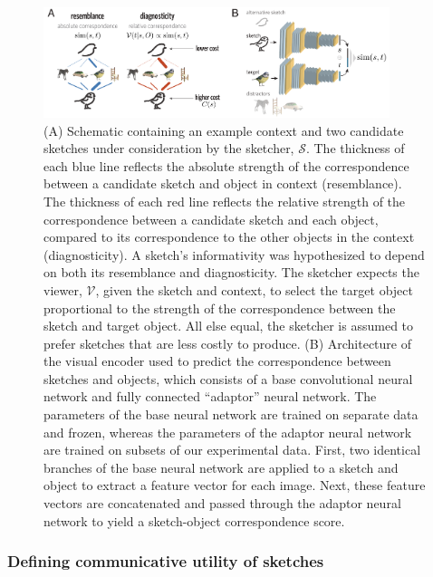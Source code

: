 \documentclass[9pt,twocolumn,twoside]{pnas-new}
\begin{document}
\begin{figure}[htbp]
\centering
\includegraphics[width=0.9\textwidth]{figures/4_model_schematic-min.pdf}
\caption{
(A) Schematic containing an example context and two candidate sketches under consideration by the sketcher, $\mathcal{S}$. 
The thickness of each blue line reflects the absolute strength of the correspondence between a candidate sketch and object in context (resemblance). 
The thickness of each red line reflects the relative strength of the correspondence between a candidate sketch and each object, compared to its correspondence to the other objects in the context (diagnosticity). 
A sketch's informativity was hypothesized to depend on both its resemblance and diagnosticity. 
The sketcher expects the viewer, $\mathcal{V}$, given the sketch and context, to select the target object proportional to the strength of the correspondence between the sketch and target object. 
All else equal, the sketcher is assumed to prefer sketches that are less costly to produce.
(B) Architecture of the visual encoder used to predict the correspondence between sketches and objects, which consists of a base convolutional neural network and fully connected ``adaptor'' neural network. 
The parameters of the base neural network are trained on separate data and frozen, whereas the parameters of the adaptor neural network are trained on subsets of our experimental data. 
First, two identical branches of the base neural network are applied to a sketch and object to extract a feature vector for each image. 
Next, these feature vectors are concatenated and passed through the adaptor neural network to yield a sketch-object correspondence score.}
\label{model_schematic}
\end{figure}

\subsubsection*{Defining communicative utility of sketches}
\end{document}
